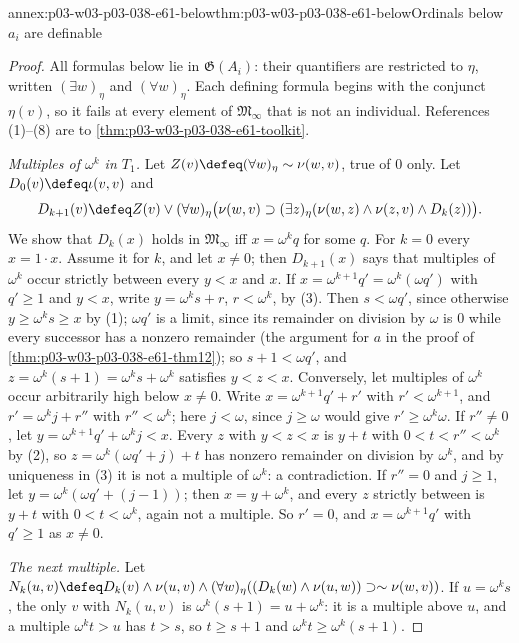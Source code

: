 \begin{annexitem}{annex:p03-w03-p03-038-e61-below}{thm:p03-w03-p03-038-e61-below}{Ordinals below \(a_i\) are definable}
\begin{proof}
All formulas below lie in \(\mathfrak G(A_i)\): their quantifiers are
restricted to \(\eta\), written \((\exists w)_\eta\) and
\((\forall w)_\eta\). Each defining formula begins with the conjunct
\(\eta(v)\), so it fails at every element of \(\mathfrak M_\infty\) that is
not an individual. References (1)--(8) are to
\cref{thm:p03-w03-p03-038-e61-toolkit}.

\emph{Multiples of \(\omega^k\) in \(T_1\).} Let
\(Z(v)\defeq(\forall w)_\eta\sim\nu(w,v)\), true of \(0\) only. Let
\(D_0(v)\defeq\iota(v,v)\) and
\[D_{k+1}(v)\defeq Z(v)\vee(\forall w)_\eta\bigl(\nu(w,v)\supset
(\exists z)_\eta(\nu(w,z)\wedge\nu(z,v)\wedge D_k(z))\bigr).\]
We show that \(D_k(x)\) holds in \(\mathfrak M_\infty\) iff
\(x=\omega^kq\) for some \(q\). For \(k=0\) every \(x=1\cdot x\). Assume it
for \(k\), and let \(x\ne0\); then \(D_{k+1}(x)\) says that multiples of
\(\omega^k\) occur strictly between every \(y<x\) and \(x\).
If \(x=\omega^{k+1}q'=\omega^k(\omega q')\) with \(q'\ge1\) and \(y<x\),
write \(y=\omega^ks+r\), \(r<\omega^k\), by (3). Then \(s<\omega q'\),
since otherwise \(y\ge\omega^ks\ge x\) by (1); \(\omega q'\) is a limit,
since its remainder on division by \(\omega\) is \(0\) while every
successor has a nonzero remainder (the argument for \(a\) in the proof of
\cref{thm:p03-w03-p03-038-e61-thm12}); so \(s+1<\omega q'\), and
\(z=\omega^k(s+1)=\omega^ks+\omega^k\) satisfies \(y<z<x\).
Conversely, let multiples of \(\omega^k\) occur arbitrarily high below
\(x\ne0\). Write \(x=\omega^{k+1}q'+r'\) with \(r'<\omega^{k+1}\), and
\(r'=\omega^kj+r''\) with \(r''<\omega^k\); here \(j<\omega\), since
\(j\ge\omega\) would give \(r'\ge\omega^k\omega\). If \(r''\ne0\), let
\(y=\omega^{k+1}q'+\omega^kj<x\). Every \(z\) with \(y<z<x\) is
\(y+t\) with \(0<t<r''<\omega^k\) by (2), so
\(z=\omega^k(\omega q'+j)+t\) has nonzero remainder on division by
\(\omega^k\), and by uniqueness in (3) it is not a multiple of
\(\omega^k\): a contradiction. If \(r''=0\) and \(j\ge1\), let
\(y=\omega^k(\omega q'+(j-1))\); then \(x=y+\omega^k\), and every \(z\)
strictly between is \(y+t\) with \(0<t<\omega^k\), again not a multiple.
So \(r'=0\), and \(x=\omega^{k+1}q'\) with \(q'\ge1\) as \(x\ne0\).

\emph{The next multiple.} Let
\(N_k(u,v)\defeq D_k(v)\wedge\nu(u,v)\wedge(\forall w)_\eta
((D_k(w)\wedge\nu(u,w))\supset\sim\nu(w,v))\). If \(u=\omega^ks\), the
only \(v\) with \(N_k(u,v)\) is \(\omega^k(s+1)=u+\omega^k\): it is a
multiple above \(u\), and a multiple \(\omega^kt>u\) has \(t>s\), so
\(t\ge s+1\) and \(\omega^kt\ge\omega^k(s+1)\).


\end{proof}
\end{annexitem}
